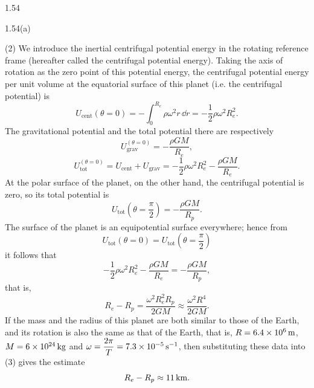 \begin{solution}{1.54}
\begin{figbox}{1.54(a)}
\end{figbox}

(2) We introduce the inertial centrifugal potential energy in the rotating reference frame (hereafter called the centrifugal potential energy). Taking the axis of rotation as the zero point of this potential energy, the centrifugal potential energy per unit volume at the equatorial surface of this planet (i.e. the centrifugal potential) is
\[
U_{\text{cent}}(\theta=0)=-\int_{0}^{R_e}\rho\omega^2r\,\dd r=-\frac{1}{2}\rho\omega^2R_e^2.
\]
The gravitational potential and the total potential there are respectively
\[
U_{\text{grav}}^{(\theta=0)}=-\frac{\rho GM}{R_e},
\]
\[
U_{\text{tot}}^{(\theta=0)}=U_{\text{cent}}+U_{\text{grav}}=-\frac{1}{2}\rho\omega^2R_e^2-\frac{\rho GM}{R_e}.
\]
At the polar surface of the planet, on the other hand, the centrifugal potential is zero, so its total potential is
\[
U_{\text{tot}}\left(\theta=\frac{\pi}{2}\right)=-\frac{\rho GM}{R_p}.
\]
The surface of the planet is an equipotential surface everywhere; hence from
\[
U_{\text{tot}}(\theta=0)=U_{\text{tot}}\left(\theta=\frac{\pi}{2}\right)
\]
it follows that
\[
-\frac{1}{2}\rho\omega^2R_e^2-\frac{\rho GM}{R_e}=-\frac{\rho GM}{R_p},
\]
that is,
\begin{equation}
R_e-R_p=\frac{\omega^2R_e^2R_p}{2GM}\approx\frac{\omega^2R^4}{2GM}. \tag{3}
\end{equation}
If the mass and the radius of this planet are both similar to those of the Earth, and its rotation is also the same as that of the Earth, that is, $R=6.4\times10^6\,\mathrm{m}$, $M=6\times10^{24}\,\mathrm{kg}$ and $\omega=\dfrac{2\pi}{T}=7.3\times10^{-5}\,\mathrm{s^{-1}}$, then substituting these data into (3) gives the estimate
\[
R_e-R_p\approx11\,\mathrm{km}.
\]


\end{solution}
